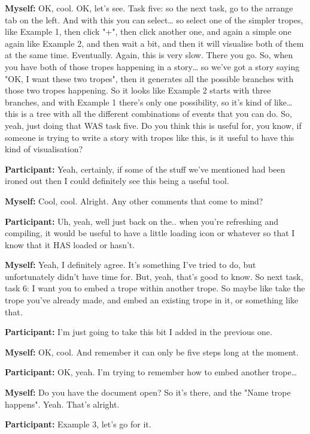 \documentclass[11pt]{report}
\begin{document}
\begin{linenumbers}
\textbf{Myself:} OK, cool. OK, let's see. Task five: so the next task, go to the arrange tab on the left. And with this you can select\ldots{} so select one of the simpler tropes, like Example 1, then click "+", then click another one, and again a simple one again like Example 2, and then wait a bit, and then it will visualise both of them at the same time. Eventually. Again, this is very slow. There you go. So, when you have both of those tropes happening in a story\ldots{} so we've got a story saying "OK, I want these two tropes", then it generates all the possible branches with those two tropes happening. So it looks like Example 2 starts with three branches, and with Example 1 there's only one possibility, so it's kind of like\ldots{} this is a tree with all the different combinations of events that you can do. So, yeah, just doing that WAS task five. Do you think this is useful for, you know, if someone is trying to write a story with tropes like this, is it useful to have this kind of visualisation?

\textbf{Participant:} Yeah, certainly, if some of the stuff we've mentioned had been ironed out then I could definitely see this being a useful tool.

\textbf{Myself:} Cool, cool. Alright. Any other comments that come to mind?

\textbf{Participant:} Uh, yeah, well just back on the.. when you're refreshing and compiling, it would be useful to have a little loading icon or whatever so that I know that it HAS loaded or hasn't.

\textbf{Myself:} Yeah, I definitely agree. It's something I've tried to do, but unfortunately didn't have time for. But, yeah, that's good to know. So next task, task 6: I want you to embed a trope within another trope. So maybe like take the trope you've already made, and embed an existing trope in it, or something like that.

\textbf{Participant:} I'm just going to take this bit I added in the previous one.

\textbf{Myself:} OK, cool. And remember it can only be five steps long at the moment.

\textbf{Participant:} OK, yeah. I'm trying to remember how to embed another trope\ldots{}

\textbf{Myself:} Do you have the document open? So it's there, and the "Name trope happens". Yeah. That's alright.

\textbf{Participant:} Example 3, let's go for it.


\end{linenumbers}
\end{document}
